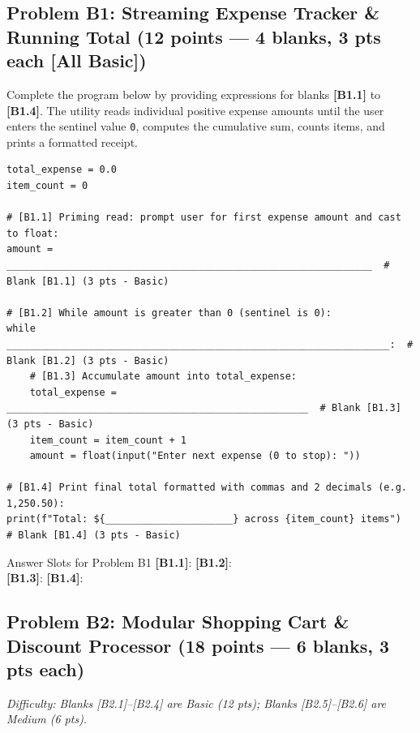 \documentclass[11pt,a4paper]{article}
\begin{document}
\subsection*{Problem B1: Streaming Expense Tracker \& Running Total (12 points --- 4 blanks, 3 pts each [All Basic])}
Complete the program below by providing expressions for blanks \textbf{[B1.1]} to \textbf{[B1.4]}.
The utility reads individual positive expense amounts until the user enters the sentinel value \texttt{0}, computes the cumulative sum, counts items, and prints a formatted receipt.

\begin{lstlisting}
total_expense = 0.0
item_count = 0

# [B1.1] Priming read: prompt user for first expense amount and cast to float:
amount = _______________________________________________________________  # Blank [B1.1] (3 pts - Basic)

# [B1.2] While amount is greater than 0 (sentinel is 0):
while __________________________________________________________________:  # Blank [B1.2] (3 pts - Basic)
    # [B1.3] Accumulate amount into total_expense:
    total_expense = ____________________________________________________  # Blank [B1.3] (3 pts - Basic)
    item_count = item_count + 1
    amount = float(input("Enter next expense (0 to stop): "))

# [B1.4] Print final total formatted with commas and 2 decimals (e.g. 1,250.50):
print(f"Total: ${______________________} across {item_count} items")       # Blank [B1.4] (3 pts - Basic)
\end{lstlisting}

\begin{answerbox}[height=1.8cm]{Answer Slots for Problem B1}
\textbf{[B1.1]}: \dotfill \quad \textbf{[B1.2]}: \dotfill\\[1.5mm]
\textbf{[B1.3]}: \dotfill \quad \textbf{[B1.4]}: \dotfill
\end{answerbox}

\newpage


\subsection*{Problem B2: Modular Shopping Cart \& Discount Processor (18 points --- 6 blanks, 3 pts each)}
\textit{Difficulty: Blanks [B2.1]--[B2.4] are Basic (12 pts); Blanks [B2.5]--[B2.6] are Medium (6 pts).}
\end{document}

